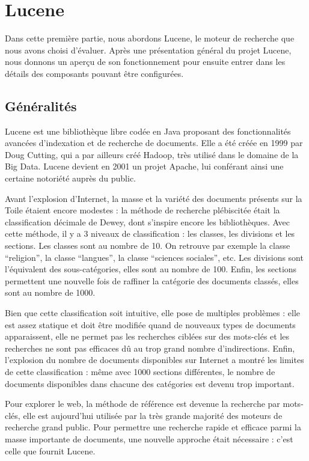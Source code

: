 \section{Lucene}

Dans cette première partie, nous abordons Lucene, le moteur de recherche que nous avons choisi d’évaluer. Après une présentation général du projet Lucene, nous donnons un aperçu de son fonctionnement pour ensuite entrer dans les détails des composants pouvant être configurées.

\subsection{Généralités}

Lucene est une bibliothèque libre codée en Java proposant des fonctionnalités avancées d’indexation et de recherche de documents. Elle a été créée en 1999 par Doug Cutting, qui a par ailleurs créé Hadoop, très utilisé dans le domaine de la Big Data. Lucene devient en 2001 un projet Apache, lui conférant ainsi une certaine notoriété auprès du public.

Avant l’explosion d’Internet, la masse et la variété des documents présents sur la Toile étaient encore modestes : la méthode de recherche plébiscitée était la classification décimale de Dewey, dont s’inspire encore les bibliothèques. Avec cette méthode, il y a 3 niveaux de classification : les classes, les divisions et les sections. Les classes sont au nombre de 10. On retrouve par exemple la classe “religion”, la classe “langues”, la classe “sciences sociales”, etc. Les divisions sont l’équivalent des sous-catégories, elles sont au nombre de 100. Enfin, les sections permettent une nouvelle fois de raffiner la catégorie des documents classés, elles sont au nombre de 1000.

Bien que cette classification soit intuitive, elle pose de multiples problèmes : elle est assez statique et doit être modifiée quand de nouveaux types de documents apparaissent, elle ne permet pas les recherches ciblées sur des mots-clés et les recherches ne sont pas efficaces dû au trop grand nombre d’indirections. Enfin, l’explosion du nombre de documents disponibles sur Internet a montré les limites de cette classification : même avec 1000 sections différentes, le nombre de documents disponibles dans chacune des catégories est devenu trop important.

Pour explorer le web, la méthode de référence est devenue la recherche par mots-clés, elle est aujourd’hui utilisée par la très grande majorité des moteurs de recherche grand public. Pour permettre une recherche rapide et efficace parmi la masse importante de documents, une nouvelle approche était nécessaire : c’est celle que fournit Lucene.

